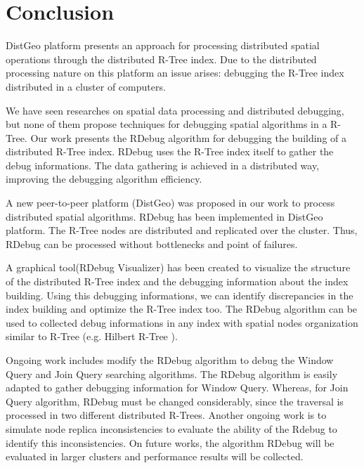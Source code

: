 \section{Conclusion}
\label{sec:conclusion}

DistGeo platform presents an approach for processing distributed spatial operations through the distributed R-Tree index. 
Due to the distributed processing nature on this platform an issue arises: debugging the R-Tree index distributed in a cluster of computers.

We have seen researches on spatial data processing and distributed debugging, but none of them propose techniques for debugging spatial algorithms in a R-Tree. 
Our work presents the RDebug algorithm for debugging the building of a distributed R-Tree index. 
RDebug uses the R-Tree index itself to gather the debug informations. 
The data gathering is achieved in a distributed way, improving the debugging algorithm efficiency.

A new peer-to-peer platform (DistGeo) was proposed in our work to process distributed spatial algorithms.
RDebug has been implemented in DistGeo platform. The R-Tree nodes are distributed and replicated over the cluster. 
Thus, RDebug can be processed without bottlenecks and point of failures.

A graphical tool(RDebug Visualizer) has been created to visualize the structure of the distributed R-Tree index and the debugging information about the index building. 
Using this debugging informations, we can identify discrepancies in the index building and optimize the R-Tree index too.
The RDebug algorithm can be used to collected debug informations in any index with spatial nodes organization similar to R-Tree (e.g. Hilbert R-Tree \cite{kamel1994hilbert}).

Ongoing work includes modify the RDebug algorithm to debug the Window Query and Join Query searching algorithms. 
The RDebug algorithm is easily adapted to gather debugging information for Window Query. 
Whereas, for Join Query algorithm, RDebug must be changed considerably, since the traversal is processed in two different distributed R-Trees. 
Another ongoing work is to simulate node replica inconsistencies to evaluate the ability of the Rdebug to identify this inconsistencies.
On future works, the algorithm RDebug will be evaluated in larger clusters and performance results will be collected.
